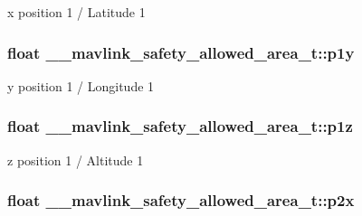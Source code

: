 x position 1 / Latitude 1 

\hypertarget{struct____mavlink__safety__allowed__area__t_a31433025a6ccc7032b9142172824339a}{
\subsubsection[{p1y}]{\setlength{\rightskip}{0pt plus 5cm}float \+\_\+\+\_\+mavlink\+\_\+safety\+\_\+allowed\+\_\+area\+\_\+t\+::p1y}}\label{struct____mavlink__safety__allowed__area__t_a31433025a6ccc7032b9142172824339a}


y position 1 / Longitude 1 

\hypertarget{struct____mavlink__safety__allowed__area__t_ad1c4edfad8de3bcc22fa3c18d14fc101}{
\subsubsection[{p1z}]{\setlength{\rightskip}{0pt plus 5cm}float \+\_\+\+\_\+mavlink\+\_\+safety\+\_\+allowed\+\_\+area\+\_\+t\+::p1z}}\label{struct____mavlink__safety__allowed__area__t_ad1c4edfad8de3bcc22fa3c18d14fc101}


z position 1 / Altitude 1 

\hypertarget{struct____mavlink__safety__allowed__area__t_a6a558f454d61143884a162cf3710308e}{
\subsubsection[{p2x}]{\setlength{\rightskip}{0pt plus 5cm}float \+\_\+\+\_\+mavlink\+\_\+safety\+\_\+allowed\+\_\+area\+\_\+t\+::p2x}}\label{struct____mavlink__safety__allowed__area__t_a6a558f454d61143884a162cf3710308e}


